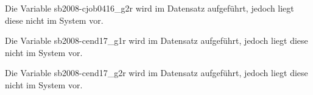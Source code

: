 \documentclass[a4paper]{article}
\begin{document}
				

				

				

				

				

				

				

				

				

				

				

				

				

				

				

				

				

				

				

		Die Variable sb2008-cjob0416\_g2r wird im Datensatz aufgeführt, jedoch liegt diese nicht im System vor.

				

				

				

				

				

				

				

		Die Variable sb2008-cend17\_g1r wird im Datensatz aufgeführt, jedoch liegt diese nicht im System vor.

		Die Variable sb2008-cend17\_g2r wird im Datensatz aufgeführt, jedoch liegt diese nicht im System vor.

				

				
\end{document}
